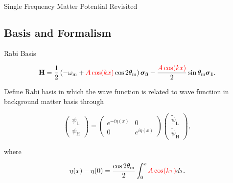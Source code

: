 \documentclass[9pt]{beamer}
\begin{document}
\begin{darkframes}
\begin{frame}{Single Frequency Matter Potential Revisited}
\end{frame}



\subsection{Basis and Formalism}



\begin{frame}{Rabi Basis}



\begin{tcolorbox}[title=Hamiltonian in Background Matter Basis]
    \begin{equation*}
    \mathbf {H} = \frac{1}{2}\left( - \omega_{\mathrm{m}} + {\color{red}A\cos(kx)} \cos 2\theta_{\mathrm{m}} \right) \boldsymbol{\sigma_3} - \frac{  {\color{red}A\cos (kx)}  }{2} \sin \theta_{\mathrm{m}} \boldsymbol{\sigma_1}.
\end{equation*}
\end{tcolorbox}


\begin{tcolorbox}[title=A Better Basis]


Define Rabi basis %
in which the wave function is related to wave function in background matter basis
through

\begin{equation*}
    \begin{pmatrix}
    \psi_{\mathrm{L} } \\
    \psi_{\mathrm{H} }
    \end{pmatrix} = \begin{pmatrix}
     e^{-i \eta (x)} & 0 \\  0 & e^{i \eta (x)}
    \end{pmatrix}\begin{pmatrix}
    \tilde\psi_{\mathrm{L} }\\
    \tilde\psi_{\mathrm{H} }
    \end{pmatrix},
\end{equation*}

where

\begin{equation*}
    \eta(x) - \eta(0) = \frac{\cos 2\theta_{\mathrm{m}}}{2} \int_0^x {\color{red}A\cos(k \tau)} d\tau.
\end{equation*}

\end{tcolorbox}




\end{frame}
\end{darkframes}
\end{document}

